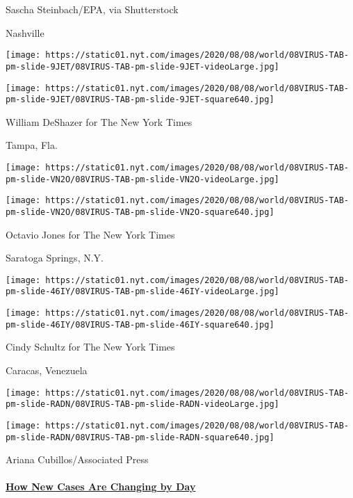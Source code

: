 Sascha Steinbach/EPA, via Shutterstock

Nashville

\texttt{[image: https://static01.nyt.com/images/2020/08/08/world/08VIRUS-TAB-pm-slide-9JET/08VIRUS-TAB-pm-slide-9JET-videoLarge.jpg]}

\texttt{[image: https://static01.nyt.com/images/2020/08/08/world/08VIRUS-TAB-pm-slide-9JET/08VIRUS-TAB-pm-slide-9JET-square640.jpg]}

William DeShazer for The New York Times

Tampa, Fla.

\texttt{[image: https://static01.nyt.com/images/2020/08/08/world/08VIRUS-TAB-pm-slide-VN2O/08VIRUS-TAB-pm-slide-VN2O-videoLarge.jpg]}

\texttt{[image: https://static01.nyt.com/images/2020/08/08/world/08VIRUS-TAB-pm-slide-VN2O/08VIRUS-TAB-pm-slide-VN2O-square640.jpg]}

Octavio Jones for The New York Times

Saratoga Springs, N.Y.

\texttt{[image: https://static01.nyt.com/images/2020/08/08/world/08VIRUS-TAB-pm-slide-46IY/08VIRUS-TAB-pm-slide-46IY-videoLarge.jpg]}

\texttt{[image: https://static01.nyt.com/images/2020/08/08/world/08VIRUS-TAB-pm-slide-46IY/08VIRUS-TAB-pm-slide-46IY-square640.jpg]}

Cindy Schultz for The New York Times

Caracas, Venezuela

\texttt{[image: https://static01.nyt.com/images/2020/08/08/world/08VIRUS-TAB-pm-slide-RADN/08VIRUS-TAB-pm-slide-RADN-videoLarge.jpg]}

\texttt{[image: https://static01.nyt.com/images/2020/08/08/world/08VIRUS-TAB-pm-slide-RADN/08VIRUS-TAB-pm-slide-RADN-square640.jpg]}

Ariana Cubillos/Associated Press

\hypertarget{how-new-cases-are-changing-by-day}{%
\paragraph{\texorpdfstring{\href{https://www.nytimes.com/interactive/2020/world/coronavirus-maps.html}{How
New Cases Are Changing by
Day}}{How New Cases Are Changing by Day}}\label{how-new-cases-are-changing-by-day}}

\href{https://www.nytimes.com/interactive/2020/us/coronavirus-us-cases.html}{}

